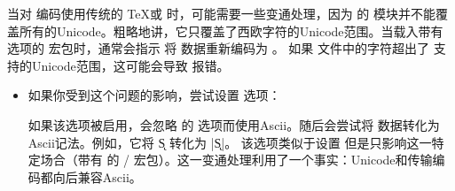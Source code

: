 当对 \utf 编码使用传统的 \TeX 或 \pdfTeX 时，可能需要一些变通处理，因为  的  模块并不能覆盖所有的Unicode。粗略地讲，它只覆盖了西欧字符的Unicode范围。当载入带有  选项的  宏包时，\biblatex 通常会指示 \biber 将  数据重新编码为 \utf。
如果  文件中的字符超出了  支持的Unicode范围，这可能会导致  报错。

\begin{itemize}

\item
如果你受到这个问题的影响，尝试设置  选项：

\begin{ltxexample}
\usepackage[utf8]{inputenc}
\usepackage[safeinputenc]{biblatex}
\end{ltxexample}
%
如果该选项被启用，\biblatex 会忽略  的  选项而使用Ascii。\biber 随后会尝试将  数据转化为Ascii记法。例如，它将 \k{S} 转化为 |\k{S}|。
该选项类似于设置  但是只影响这一特定场合（带有 \utf 的 \slash {} 宏包）。这一变通处理利用了一个事实：Unicode和\utf 传输编码都向后兼容Ascii。

\end{itemize}

